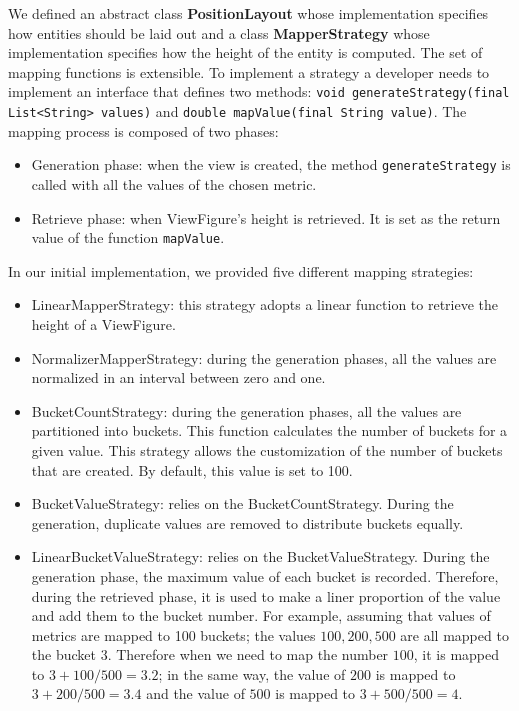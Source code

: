 We defined an abstract class \textbf{PositionLayout} whose implementation specifies how entities should be laid out and a class \textbf{MapperStrategy} whose implementation specifies how the height of the entity is computed. The set of mapping functions is extensible. To implement a strategy a developer needs to implement an interface that defines two methods: \texttt{void generateStrategy(final List<String> values)} and \texttt{double mapValue(final String value)}. The mapping process is composed of two phases:
\begin{itemize}
    \item Generation phase: when the view is created, the method \texttt{generateStrategy} is called with all the values of the chosen metric. 
    \item Retrieve phase: when ViewFigure's height is retrieved. It is set as the return value of the function \texttt{mapValue}. 
\end{itemize}
\noindent
In our initial implementation, we provided five different mapping strategies:
\begin{itemize}
    \item LinearMapperStrategy: this strategy adopts a linear function to retrieve the height of a ViewFigure. 
    \item NormalizerMapperStrategy: during the generation phases, all the values are normalized in an interval between zero and one.

    \item BucketCountStrategy: during the generation phases, all the values are partitioned into buckets. This function calculates the number of buckets for a given value. This strategy allows the customization of the number of buckets that are created. By default, this value is set to 100. 
    \item BucketValueStrategy: relies on the BucketCountStrategy. During the generation, duplicate values are removed to distribute buckets equally.

    \item LinearBucketValueStrategy: relies on the BucketValueStrategy. During the generation phase, the maximum value of each bucket is recorded. Therefore, during the retrieved phase, it is used to make a liner proportion of the value and add them to the bucket number. For example, assuming that values of metrics are mapped to 100 buckets; the values $100, 200, 500$ are all mapped to the bucket $3$. Therefore when we need to map the number $100$, it is mapped to $3 + 100/500 = 3.2$; in the same way, the value of $200$ is mapped to $3 + 200/500 = 3.4$ and the value of $500$ is mapped to $3 + 500/500 = 4$.
\end{itemize}



